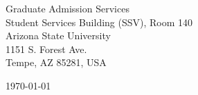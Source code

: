 \begin{minipage}{0.49\textwidth}
\begin{flushleft}
\noindent
Graduate Admission Services \\
Student Services Building (SSV), Room 140 \\
Arizona State University \\
1151 S. Forest Ave. \\
Tempe, AZ 85281, USA
\end{flushleft}
\end{minipage}
\begin{minipage}{0.47\textwidth}
\begin{flushright}
\today
\end{flushright}
\end{minipage} \\

\newcommand{\univ}{Arizona State University}
\newcommand{\univshort}{ASU}
\newcommand{\degree}{Ph.D.}
\newcommand{\dept}{Data Science, Analytics and Engineering}